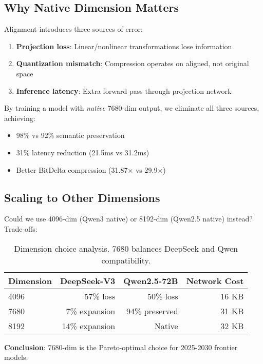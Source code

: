 \documentclass[11pt,letterpaper]{article}
\begin{document}
\subsection{Why Native Dimension Matters}

Alignment introduces three sources of error:
\begin{enumerate}
    \item \textbf{Projection loss}: Linear/nonlinear transformations lose information
    \item \textbf{Quantization mismatch}: Compression operates on aligned, not original space
    \item \textbf{Inference latency}: Extra forward pass through projection network
\end{enumerate}

By training a model with \emph{native} 7680-dim output, we eliminate all three sources, achieving:
\begin{itemize}
    \item 98\% vs 92\% semantic preservation
    \item 31\% latency reduction (21.5ms vs 31.2ms)
    \item Better BitDelta compression (31.87× vs 29.9×)
\end{itemize}

\subsection{Scaling to Other Dimensions}

Could we use 4096-dim (Qwen3 native) or 8192-dim (Qwen2.5 native) instead? Trade-offs:

\begin{table}[h]
\centering
\begin{tabular}{lrrr}
\toprule
\textbf{Dimension} & \textbf{DeepSeek-V3} & \textbf{Qwen2.5-72B} & \textbf{Network Cost} \\
\midrule
4096 & 57\% loss & 50\% loss & 16 KB \\
7680 & 7\% expansion & 94\% preserved & 31 KB \\
8192 & 14\% expansion & Native & 32 KB \\
\bottomrule
\end{tabular}
\caption{Dimension choice analysis. 7680 balances DeepSeek and Qwen compatibility.}
\end{table}

\textbf{Conclusion}: 7680-dim is the Pareto-optimal choice for 2025-2030 frontier models.
\end{document}
